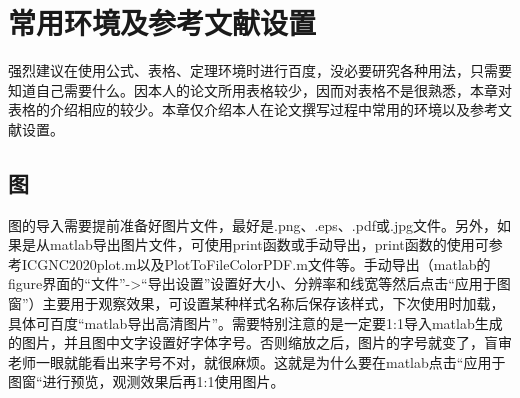 
\chapter{常用环境及参考文献设置}
强烈建议在使用公式、表格、定理环境时进行百度，没必要研究各种用法，只需要知道自己需要什么。因本人的论文所用表格较少，因而对表格不是很熟悉，本章对表格的介绍相应的较少。本章仅介绍本人在论文撰写过程中常用的环境以及参考文献设置。

\section{图}
图的导入需要提前准备好图片文件，最好是.png、.eps、.pdf或.jpg文件。另外，如果是从matlab导出图片文件，可使用print函数或手动导出，print函数的使用可参考ICGNC2020plot.m以及PlotToFileColorPDF.m文件等。手动导出（matlab的figure界面的“文件”->“导出设置”设置好大小、分辨率和线宽等然后点击“应用于图窗”）主要用于观察效果，可设置某种样式名称后保存该样式，下次使用时加载，具体可百度“matlab导出高清图片”。需要特别注意的是一定要1:1导入matlab生成的图片，并且图中文字设置好字体字号。否则缩放之后，图片的字号就变了，盲审老师一眼就能看出来字号不对，就很麻烦。这就是为什么要在matlab点击“应用于图窗“进行预览，观测效果后再1:1使用图片。

